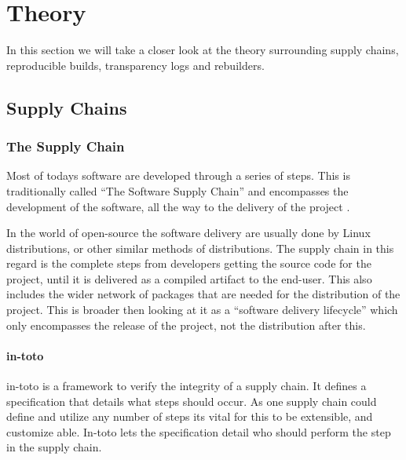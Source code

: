 \documentclass[../Main/thesis.tex]{subfiles}
\begin{document}
\chapter{Theory}
\label{ch:theory}
In this section we will take a closer look at the theory surrounding
supply chains, reproducible builds, transparency logs and rebuilders.

\section{Supply Chains}\label{sec:supply_chain}
    \subsection*{The Supply Chain}

    Most of todays software are developed through a series of steps. This is
    traditionally called ``The Software Supply Chain'' and encompasses the
    development of the software, all the way to the delivery of the project
    \cite{rj-ellison-2010}.

    In the world of open-source the software delivery are usually done by Linux
    distributions, or other similar methods of distributions. The supply chain
    in this regard is the complete steps from developers getting the source code
    for the project, until it is delivered as a compiled artifact to the
    end-user. This also includes the wider network of packages that are needed
    for the distribution of the project. This is broader then looking at it as a
    ``software delivery lifecycle'' which only encompasses the release of the
    project, not the distribution after this.


    \subsubsection*{in-toto}
    in-toto is a framework to verify the integrity of a supply chain. It defines
    a specification that details what steps should occur. As one supply chain
    could define and utilize any number of steps its vital for this to be
    extensible, and customize able. In-toto lets the specification detail who
    should perform the step in the supply chain.
  
\end{document}
